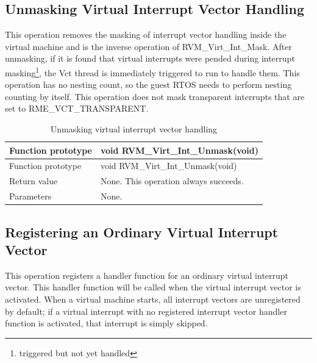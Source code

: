 \subsection{Unmasking Virtual Interrupt Vector Handling}\label{subsec:4-5-4}

This operation removes the masking of interrupt vector handling inside the virtual machine and is the inverse operation of RVM\_Virt\_Int\_Mask. After unmasking, if it is found that virtual interrupts were pended during interrupt masking\footnote{triggered but not yet handled}, the Vct thread is immediately triggered to run to handle them. This operation has no nesting count, so the guest RTOS needs to perform nesting counting by itself. This operation does not mask transparent interrupts that are set to RME\_VCT\_TRANSPARENT.

\begin{xltabular}{\textwidth}{@{}>{\hsize\raggedright\arraybackslash}X>{\hsize\raggedright\arraybackslash}X@{}}
\caption{Unmasking virtual interrupt vector handling}\label{tab:4-22}\\
\toprule
Function prototype & void RVM\_\allowbreak{}Virt\_\allowbreak{}Int\_\allowbreak{}Unmask(void)\tabularnewline
\endfirsthead
\toprule
Function prototype & void RVM\_\allowbreak{}Virt\_\allowbreak{}Int\_\allowbreak{}Unmask(void)\tabularnewline
\midrule
\endhead
\bottomrule
\endlastfoot
Return value & None. This operation always succeeds.\tabularnewline
Parameters & None.\tabularnewline
\end{xltabular}

\subsection{Registering an Ordinary Virtual Interrupt Vector}\label{subsec:4-5-5}

This operation registers a handler function for an ordinary virtual interrupt vector. This handler function will be called when the virtual interrupt vector is activated. When a virtual machine starts, all interrupt vectors are unregistered by default; if a virtual interrupt with no registered interrupt vector handler function is activated, that interrupt is simply skipped.

